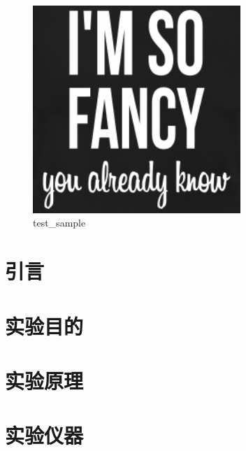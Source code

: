 \documentclass{article} %
\newcounter{source}
\begin{document}
\begin{figure}[htbp]
    \centering
    \includegraphics[width=0.7\textwidth]{resources/test_sample.png}
    \caption{test\_sample}
    \label{fig:test_sample}
\end{figure}
\lipsum[1]



\newpage

\section{引言}



\section{实验目的}



\section{实验原理}

\section {实验仪器}


\end{document}
